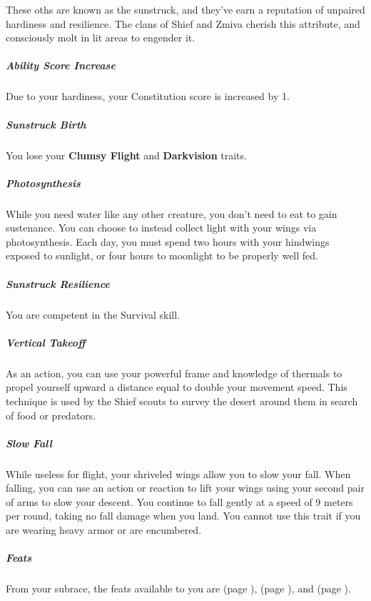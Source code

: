     These oths are known as the sunstruck, and they've earn a reputation of unpaired hardiness and resilience.
    The clans of Shief and Zmiva cherish this attribute, and consciously molt in lit areas to engender it.

    \subparagraph{Ability Score Increase} Due to your hardiness, your Constitution score is increased by 1.

    \subparagraph{Sunstruck Birth} You lose your \textbf{Clumsy Flight} and \textbf{Darkvision} traits.

    \subparagraph{Photosynthesis} While you need water like any other creature, you don't need to eat to gain sustenance.
    You can choose to instead collect light with your wings via photosynthesis.
    Each day, you must spend two hours with your hindwings exposed to sunlight, or four hours to moonlight to be properly well fed.

    \subparagraph{Sunstruck Resilience} You are competent in the Survival skill.

    \subparagraph{Vertical Takeoff} As an action, you can use your powerful frame and knowledge of thermals to propel yourself upward a distance equal to double your movement speed.
    This technique is used by the Shief scouts to survey the desert around them in search of food or predators.

    \subparagraph{Slow Fall} While useless for flight, your shriveled wings allow you to slow your fall.
    When falling, you can use an action or reaction to lift your wings using your second pair of arms to slow your descent.
    You continue to fall gently at a speed of 9 meters per round, taking no fall damage when you land.
    You cannot use this trait if you are wearing heavy armor or are encumbered.

    \subparagraph{Feats} From your subrace, the feats available to you are
    \textbf{} (page \pageref{feat::}),
    \textbf{} (page \pageref{feat::}), and
    \textbf{} (page \pageref{feat::}).

\newpage
